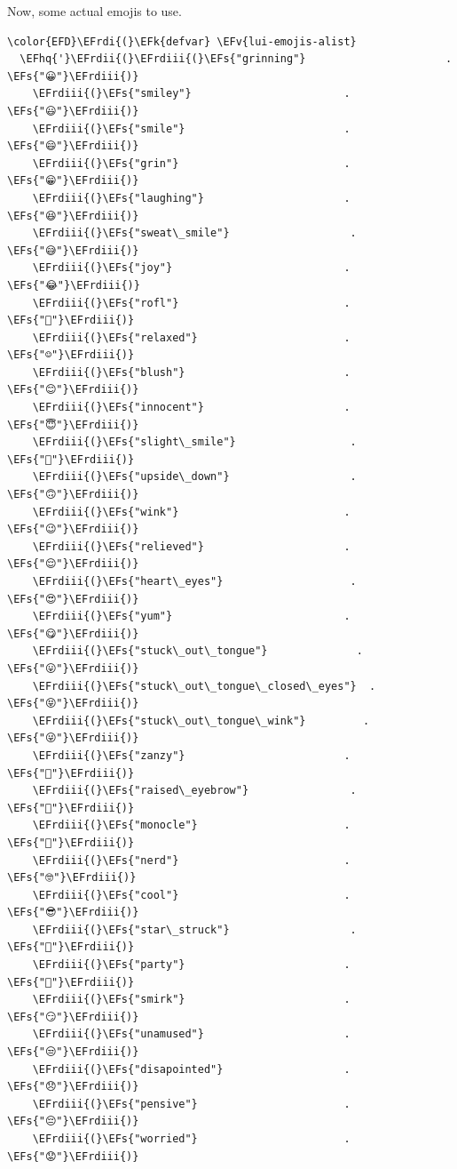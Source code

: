 \documentclass{scrartcl}
\newcommand{\EFk}[1]{\textcolor{EFk}{#1}} %
\newcommand{\EFs}[1]{\textcolor{EFs}{#1}} %
\newcommand{\EFv}[1]{\textcolor{EFv}{#1}} %
\newcommand{\EFhq}[1]{\textcolor{EFhq}{#1}} %
\newcommand{\EFrdi}[1]{\textcolor{EFrdi}{#1}} %
\newcommand{\EFrdii}[1]{\textcolor{EFrdii}{#1}} %
\newcommand{\EFrdiii}[1]{\textcolor{EFrdiii}{#1}} %
\begin{document}
Now, some actual emojis to use.
\begin{Code}
\begin{Verbatim}[]
\color{EFD}\EFrdi{(}\EFk{defvar} \EFv{lui-emojis-alist}
  \EFhq{'}\EFrdii{(}\EFrdiii{(}\EFs{"grinning"}                      . \EFs{"😀"}\EFrdiii{)}
    \EFrdiii{(}\EFs{"smiley"}                        . \EFs{"😃"}\EFrdiii{)}
    \EFrdiii{(}\EFs{"smile"}                         . \EFs{"😄"}\EFrdiii{)}
    \EFrdiii{(}\EFs{"grin"}                          . \EFs{"😁"}\EFrdiii{)}
    \EFrdiii{(}\EFs{"laughing"}                      . \EFs{"😆"}\EFrdiii{)}
    \EFrdiii{(}\EFs{"sweat\_smile"}                   . \EFs{"😅"}\EFrdiii{)}
    \EFrdiii{(}\EFs{"joy"}                           . \EFs{"😂"}\EFrdiii{)}
    \EFrdiii{(}\EFs{"rofl"}                          . \EFs{"🤣"}\EFrdiii{)}
    \EFrdiii{(}\EFs{"relaxed"}                       . \EFs{"☺️"}\EFrdiii{)}
    \EFrdiii{(}\EFs{"blush"}                         . \EFs{"😊"}\EFrdiii{)}
    \EFrdiii{(}\EFs{"innocent"}                      . \EFs{"😇"}\EFrdiii{)}
    \EFrdiii{(}\EFs{"slight\_smile"}                  . \EFs{"🙂"}\EFrdiii{)}
    \EFrdiii{(}\EFs{"upside\_down"}                   . \EFs{"🙃"}\EFrdiii{)}
    \EFrdiii{(}\EFs{"wink"}                          . \EFs{"😉"}\EFrdiii{)}
    \EFrdiii{(}\EFs{"relieved"}                      . \EFs{"😌"}\EFrdiii{)}
    \EFrdiii{(}\EFs{"heart\_eyes"}                    . \EFs{"😍"}\EFrdiii{)}
    \EFrdiii{(}\EFs{"yum"}                           . \EFs{"😋"}\EFrdiii{)}
    \EFrdiii{(}\EFs{"stuck\_out\_tongue"}              . \EFs{"😛"}\EFrdiii{)}
    \EFrdiii{(}\EFs{"stuck\_out\_tongue\_closed\_eyes"}  . \EFs{"😝"}\EFrdiii{)}
    \EFrdiii{(}\EFs{"stuck\_out\_tongue\_wink"}         . \EFs{"😜"}\EFrdiii{)}
    \EFrdiii{(}\EFs{"zanzy"}                         . \EFs{"🤪"}\EFrdiii{)}
    \EFrdiii{(}\EFs{"raised\_eyebrow"}                . \EFs{"🤨"}\EFrdiii{)}
    \EFrdiii{(}\EFs{"monocle"}                       . \EFs{"🧐"}\EFrdiii{)}
    \EFrdiii{(}\EFs{"nerd"}                          . \EFs{"🤓"}\EFrdiii{)}
    \EFrdiii{(}\EFs{"cool"}                          . \EFs{"😎"}\EFrdiii{)}
    \EFrdiii{(}\EFs{"star\_struck"}                   . \EFs{"🤩"}\EFrdiii{)}
    \EFrdiii{(}\EFs{"party"}                         . \EFs{"🥳"}\EFrdiii{)}
    \EFrdiii{(}\EFs{"smirk"}                         . \EFs{"😏"}\EFrdiii{)}
    \EFrdiii{(}\EFs{"unamused"}                      . \EFs{"😒"}\EFrdiii{)}
    \EFrdiii{(}\EFs{"disapointed"}                   . \EFs{"😞"}\EFrdiii{)}
    \EFrdiii{(}\EFs{"pensive"}                       . \EFs{"😔"}\EFrdiii{)}
    \EFrdiii{(}\EFs{"worried"}                       . \EFs{"😟"}\EFrdiii{)}

\end{Verbatim}
\end{Code}
\end{document}
